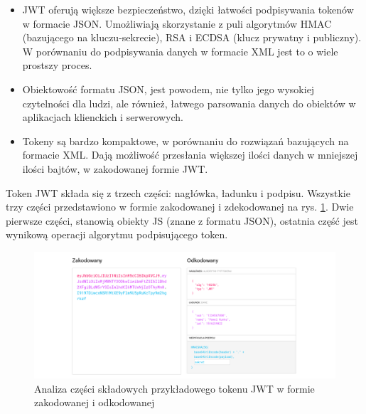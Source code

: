 \begin{itemize}
    \item JWT oferują większe bezpieczeństwo, dzięki łatwości podpisywania tokenów w formacie JSON. Umożliwiają skorzystanie z puli algorytmów HMAC (bazującego na kluczu-sekrecie), RSA i ECDSA (klucz prywatny i publiczny). W porównaniu do podpisywania danych w formacie XML jest to o wiele prostszy proces.
    \item Obiektowość formatu JSON, jest powodem, nie tylko jego wysokiej czytelności dla ludzi, ale również, łatwego parsowania danych do obiektów w aplikacjach klienckich i serwerowych.
    \item Tokeny są bardzo kompaktowe, w porównaniu do  rozwiązań bazujących na formacie XML. Dają możliwość przesłania większej ilości danych w mniejszej ilości bajtów, w zakodowanej formie JWT.
\end{itemize}

Token JWT składa się z trzech części: nagłówka, ładunku i podpisu. Wszystkie trzy części przedstawiono w formie zakodowanej i zdekodowanej na rys. \ref{fig:jwt.parts}. Dwie pierwsze części, stanowią obiekty JS (znane z formatu JSON), ostatnia część jest wynikową operacji algorytmu podpisującego token.

\begin{figure}[!htbp] 
    \centering
    \includegraphics[width=\textwidth]{img/chapter3/jwt.parts.png}
    \caption{Analiza części składowych przykładowego tokenu JWT w formie zakodowanej i odkodowanej}
    \label{fig:jwt.parts}
\end{figure}

